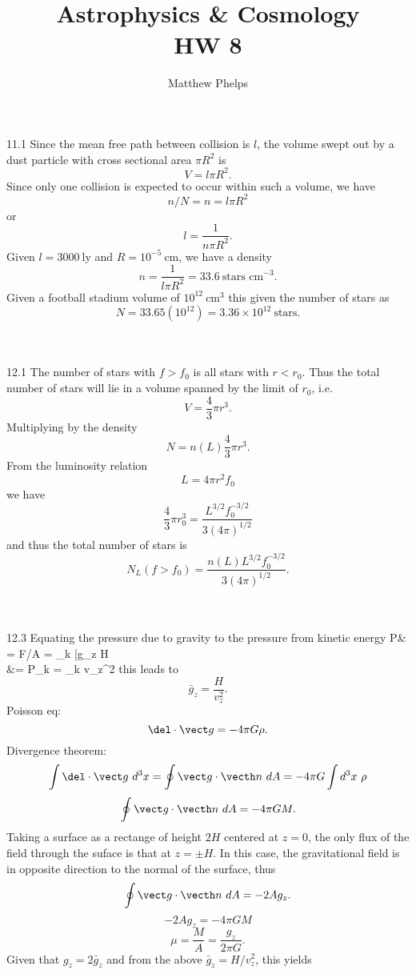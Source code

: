\documentclass[10pt,letterpaper]{article}
\title{Astrophysics \& Cosmology\\HW 8}
\author{Matthew Phelps}
\date{}
\begin{document}
\maketitle

\benum

\item[11.1]
Since the mean free path between collision is $l$, the volume swept out by a dust particle with cross sectional area $\pi R^2$ is
\[
	V = l\pi R^2.
\]
Since only one collision is expected to occur within such a volume, we have
\[
	n/N = n = l\pi R^2
\]
or
\[
	l = \frac{1}{n\pi R^2}.
\]
Given $l = 3000\ \text{ly}$ and $R = 10^{-5}\ \text{cm}$, we have a density
\[
	n = \frac{1}{l\pi R^2} = 33.6\ \text{stars cm}^{-3}.
\]
Given a football stadium volume of $10^{12}\ \text{cm}^3$ this given the number of stars as
\[
	N = 33.65(10^{12}) = 3.36 \times 10^{12}\ \text{stars}.
\]\\ \\
\item[12.1]
The number of stars with $f>f_0$ is all stars with $r<r_0$. Thus the total number of stars will lie in a volume spanned by the limit of $r_0$, i.e.
\[
	V = \frac{4}{3}\pi r^3.
\]
Multiplying by the density
\[
	N = n(L)\frac{4}{3}\pi r^3.
\]
From the luminosity relation
\[
	L = 4\pi r^2 f_0
\]
we have
\[
	\frac{4}{3}\pi r_0^3  = \frac{L^{3/2}f_0^{-3/2}}{3(4\pi)^{1/2}}
\]
and thus the total number of stars is
\[
	N_L(f>f_0) =  \frac{n(L)L^{3/2}f_0^{-3/2}}{3(4\pi)^{1/2}}.
\]
\\ \\
\item[12.3]
Equating the pressure due to gravity to the pressure from kinetic energy
\ba
	P& = F/A = \rho_k \bar g_z H\\
	&= P_k = \rho_k v_z^2
\ea
this  leads to
\[
	\bar g_z = \frac{H}{v_z^2}.
\]
Poisson eq:
\[
	\del \cdot \vect g = -4\pi G\rho.
\]
Divergence theorem:
\[
	\int \del \cdot \vect g\ d^3x = \oint \vect g \cdot \vecth n\ dA = -4\pi G\int d^3x\ \rho
\]
\[
	\oint \vect g\cdot \vecth n\ dA = -4\pi GM.
\]
Taking a surface as a rectange of height $2H$ centered at $z=0$, the only flux of the field through the suface is that at $z=\pm H$. In this case, the gravitational field is in opposite direction to the normal of the surface, thus
\[
	\oint \vect g\cdot\vecth n\ dA = -2Ag_z.
\]
\[
	-2Ag_z = -4\pi GM
\]
\[
	\mu = \frac{M}{A} = \frac{g_z}{2\pi G}.
\]
Given that $g_z = 2\bar g_z$ and from the above $\bar g_z = H/v_z^2$, this yields
\end{document}
